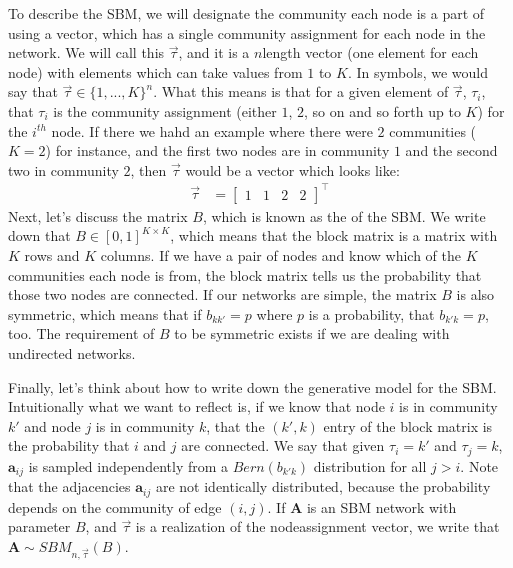 \documentclass[letterpaper,10pt,english]{jupyterBook}
\begin{document}
\sphinxAtStartPar
To describe the  SBM, we will designate the community each node is a part of using a vector, which has a single community assignment for each node in the network. We will call this  \(\vec{\tau}\), and it is a \(n\)\sphinxhyphen{}length vector (one element for each node) with elements which can take values from \(1\) to \(K\). In symbols, we would say that \(\vec\tau \in \{1, ..., K\}^n\). What this means is that for a given element of \(\vec \tau\), \(\tau_i\), that \(\tau_i\) is the community assignment (either \(1\), \(2\), so on and so forth up to \(K\)) for the \(i^{th}\) node. If there we hahd an example where there were \(2\) communities (\(K = 2\)) for instance, and the first two nodes are in community \(1\) and the second two in community \(2\), then \(\vec\tau\) would be a vector which looks like:
\begin{align*}
    \vec\tau &= \begin{bmatrix}1 & 1 & 2 & 2\end{bmatrix}^\top
\end{align*}
\sphinxAtStartPar
Next, let’s discuss the matrix \(B\), which is known as the  of the SBM. We write down that \(B \in [0, 1]^{K \times K}\), which means that the block matrix is a matrix with \(K\) rows and \(K\) columns. If we have a pair of nodes and know which of the \(K\) communities each node is from, the block matrix tells us the probability that those two nodes are connected. If our networks are simple, the matrix \(B\) is also symmetric, which means that if \(b_{kk'} = p\) where \(p\) is a probability, that \(b_{k'k} = p\), too. The requirement of \(B\) to be symmetric exists  if we are dealing with undirected networks.

\sphinxAtStartPar
Finally, let’s think about how to write down the generative model for the  SBM. Intuitionally what we want to reflect is, if we know that node \(i\) is in community \(k'\) and node \(j\) is in community \(k\), that the \((k', k)\) entry of the block matrix is the probability that \(i\) and \(j\) are connected. We say that given  \(\tau_i = k'\) and \(\tau_j = k\), \(\mathbf a_{ij}\) is sampled independently from a \(Bern(b_{k' k})\) distribution for all \(j > i\). Note that the adjacencies \(\mathbf a_{ij}\) are not  identically distributed, because the probability depends on the community of edge \((i,j)\). If \(\mathbf A\) is an  SBM network with parameter \(B\), and \(\vec{\tau}\) is a realization of the node\sphinxhyphen{}assignment vector, we write that \(\mathbf A \sim SBM_{n,\vec \tau}(B)\).
\end{document}

